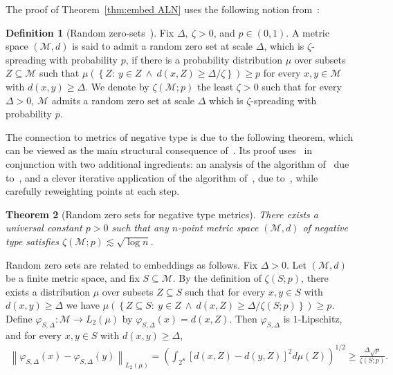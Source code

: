 \documentclass{icm2010}
\newtheorem{theorem}{Theorem}[section]
\theoremstyle{definition}
\newtheorem{definition}[theorem]{Definition}
\newcommand{\1}{\mathbf{1}}
\newcommand{\M}{\mathscr{M}}
\renewcommand{\le}{\leqslant}
\renewcommand{\ge}{\geqslant}
\newcommand{\f}{\varphi}
\begin{document}
The proof of Theorem~\ref{thm:embed ALN} uses the following notion
from~\cite{ALN08}:
\begin{definition}[Random zero-sets~\cite{ALN08}]\label{def:zero} Fix $\Delta,\ \zeta>0$,  and $p\in (0,1)$. A metric space $(\M,d)$
is said to admit a random zero set at scale $\Delta$, which is
$\zeta$-spreading with probability $p$, if there is a probability
distribution $\mu$ over subsets $Z\subseteq \M$ such that  $\mu
\left(\left\{Z:\ y\in Z\ \wedge\ d(x,Z)\ge
\Delta/\zeta\right\}\right)\ge p$ for every $x,y\in \M$ with
$d(x,y)\ge \Delta$. We denote by $\zeta(\M;p)$ the least $\zeta>0$
such that for every $\Delta>0$, $\M$ admits a random zero set at
scale $\Delta$ which is $\zeta$-spreading with probability $p$.
\end{definition}
The connection to metrics of negative type is due to the following
theorem, which can be viewed as the main structural consequence
of~\cite{ARV04}. Its proof uses~\cite{ARV04} in conjunction with two
additional ingredients: an analysis of the algorithm of~\cite{ARV04}
due to~\cite{Lee05}, and a clever iterative application of the
algorithm of~\cite{ARV04}, due to~\cite{CGR08}, while carefully
reweighting points at each step.

\begin{theorem}[Random zero sets for negative type
metrics]\label{thm:arv zero} There exists a universal constant $p>0$
such that any $n$-point metric space $(\M,d)$ of negative type
satisfies $\zeta(\M;p)\lesssim \sqrt{\log n}$.
\end{theorem}

Random zero sets are related to embeddings as follows. Fix
$\Delta>0$. Let $(\M,d)$ be a finite metric space, and fix
$S\subseteq \M$. By the definition of $\zeta(S;p)$, there exists a
distribution $\mu$ over subsets $Z\subseteq S$ such that for every
$x,y\in S$ with $d(x,y)\ge \Delta$ we have $ \mu
\left(\left\{Z\subseteq S:\ y\in Z\ \wedge\ d(x,Z)\ge
\Delta/\zeta(S;p)\right\}\right)\ge p$. Define $\f_{S,\Delta}:\M\to
L_2(\mu)$ by $\f_{S,\Delta}(x)=d(x,Z)$. Then $\f_{S,\Delta}$ is
$1$-Lipschitz, and for every $x,y\in S$ with $d(x,y)\ge \Delta$,
\begin{eqnarray}\label{eq:single}
\left\|\f_{S,\Delta}(x)-\f_{S,\Delta}(y)\right\|_{L_2(\mu)}=
\left(\int_{2^S} \left[d(x,Z)-d(y,Z)\right]^2d\mu(Z)\right)^{1/2}
\ge \frac{\Delta\sqrt{p}}{\zeta(S;p)}.
\end{eqnarray}
\end{document}
